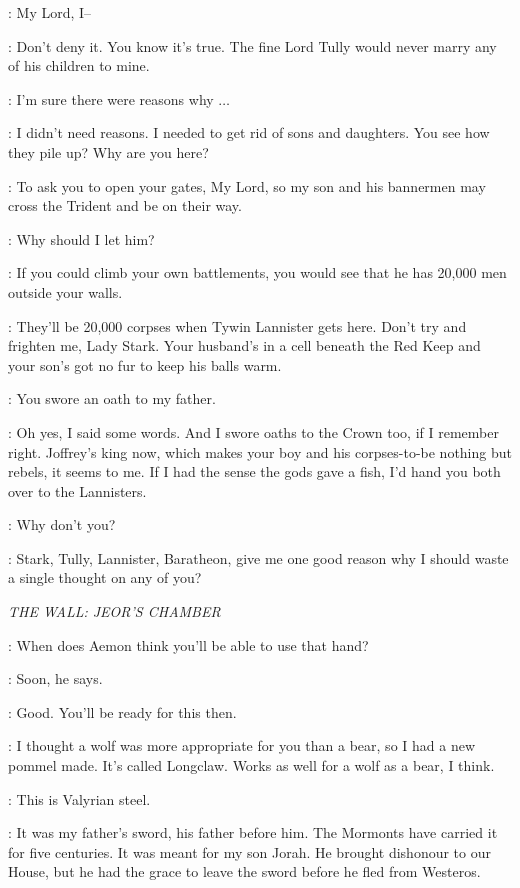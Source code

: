 \CATELYN: My Lord, I-- 

\FREY: Don't deny it. You know it's true. The fine Lord Tully would never marry any of his children to mine. 

\CATELYN: I'm sure there were reasons why $\ldots$  

\FREY: I didn't need reasons. I needed to get rid of sons and daughters. You see how they pile up? Why are you here? 

\CATELYN: To ask you to open your gates, My Lord, so my son and his bannermen may cross the Trident and be on their way. 

\FREY: Why should I let him? 

\CATELYN: If you could climb your own battlements, you would see that he has 20,000 men outside your walls. 

\FREY: They'll be 20,000 corpses when Tywin Lannister gets here. Don't try and frighten me, Lady Stark. Your husband's in a cell beneath the Red Keep and your son's got no fur to keep his balls warm. 

\CATELYN: You swore an oath to my father. 

\FREY: Oh yes, I said some words. And I swore oaths to the Crown too, if I remember right. Joffrey's king now, which makes your boy and his corpses-to-be nothing but rebels, it seems to me. If I had the sense the gods gave a fish, I'd hand you both over to the Lannisters. 

\CATELYN: Why don't you? 

\FREY: Stark, Tully, Lannister, Baratheon, give me one good reason why I should waste a single thought on any of you? 


\scene

\textit{THE WALL: JEOR'S CHAMBER} 


\JEOR: When does Aemon think you'll be able to use that hand? 

\JON: Soon, he says. 

\JEOR: Good. You'll be ready for this then. 


\JEOR: I thought a wolf was more appropriate for you than a bear, so I had a new pommel made. It's called Longclaw. Works as well for a wolf as a bear, I think. 

\JON: This is Valyrian steel. 

\JEOR: It was my father's sword, his father before him. The Mormonts have carried it for five centuries. It was meant for my son Jorah. He brought dishonour to our House, but he had the grace to leave the sword before he fled from Westeros. 

